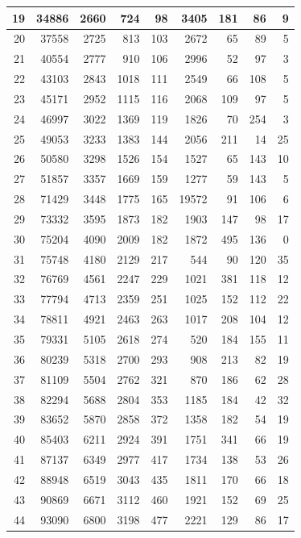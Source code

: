 \documentclass[
]{article}
\begin{document}
\begin{table}[H]
\begin{tabular}{r|r|r|r|r|r|r|r|r}
\hline
19 & 34886 & 2660 & 724 & 98 & 3405 & 181 & 86 & 9\\
\hline
20 & 37558 & 2725 & 813 & 103 & 2672 & 65 & 89 & 5\\
\hline
21 & 40554 & 2777 & 910 & 106 & 2996 & 52 & 97 & 3\\
\hline
22 & 43103 & 2843 & 1018 & 111 & 2549 & 66 & 108 & 5\\
\hline
23 & 45171 & 2952 & 1115 & 116 & 2068 & 109 & 97 & 5\\
\hline
24 & 46997 & 3022 & 1369 & 119 & 1826 & 70 & 254 & 3\\
\hline
25 & 49053 & 3233 & 1383 & 144 & 2056 & 211 & 14 & 25\\
\hline
26 & 50580 & 3298 & 1526 & 154 & 1527 & 65 & 143 & 10\\
\hline
27 & 51857 & 3357 & 1669 & 159 & 1277 & 59 & 143 & 5\\
\hline
28 & 71429 & 3448 & 1775 & 165 & 19572 & 91 & 106 & 6\\
\hline
29 & 73332 & 3595 & 1873 & 182 & 1903 & 147 & 98 & 17\\
\hline
30 & 75204 & 4090 & 2009 & 182 & 1872 & 495 & 136 & 0\\
\hline
31 & 75748 & 4180 & 2129 & 217 & 544 & 90 & 120 & 35\\
\hline
32 & 76769 & 4561 & 2247 & 229 & 1021 & 381 & 118 & 12\\
\hline
33 & 77794 & 4713 & 2359 & 251 & 1025 & 152 & 112 & 22\\
\hline
34 & 78811 & 4921 & 2463 & 263 & 1017 & 208 & 104 & 12\\
\hline
35 & 79331 & 5105 & 2618 & 274 & 520 & 184 & 155 & 11\\
\hline
36 & 80239 & 5318 & 2700 & 293 & 908 & 213 & 82 & 19\\
\hline
37 & 81109 & 5504 & 2762 & 321 & 870 & 186 & 62 & 28\\
\hline
38 & 82294 & 5688 & 2804 & 353 & 1185 & 184 & 42 & 32\\
\hline
39 & 83652 & 5870 & 2858 & 372 & 1358 & 182 & 54 & 19\\
\hline
40 & 85403 & 6211 & 2924 & 391 & 1751 & 341 & 66 & 19\\
\hline
41 & 87137 & 6349 & 2977 & 417 & 1734 & 138 & 53 & 26\\
\hline
42 & 88948 & 6519 & 3043 & 435 & 1811 & 170 & 66 & 18\\
\hline
43 & 90869 & 6671 & 3112 & 460 & 1921 & 152 & 69 & 25\\
\hline
44 & 93090 & 6800 & 3198 & 477 & 2221 & 129 & 86 & 17\\

\end{tabular}
\end{table}
\end{document}
